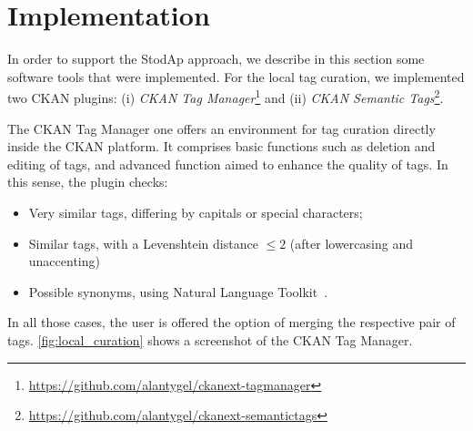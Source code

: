 \documentclass[conference]{IEEEtran}
\begin{document}

\section{Implementation}
\label{sec:implementation}

In order to support the StodAp approach, we describe in this section some software tools that were implemented.
For the local tag curation, we implemented two CKAN plugins: 
(i) \emph{CKAN Tag Manager}\footnote{\url{https://github.com/alantygel/ckanext-tagmanager}} and 
(ii) \emph{CKAN Semantic Tags}\footnote{\url{https://github.com/alantygel/ckanext-semantictags}}.

The CKAN Tag Manager one offers an environment for tag curation directly inside the CKAN platform. 
It comprises basic functions such as deletion and editing of tags, and advanced function aimed to enhance the quality of tags.
In this sense, the plugin checks:
\begin{itemize}
	\item Very similar tags, differing by capitals or special characters;
	\item Similar tags, with a Levenshtein distance $\le 2$ (after lowercasing and unaccenting)
	\item Possible synonyms, using Natural Language Toolkit~\cite{Bird2009}.
\end{itemize}
In all those cases, the user is offered the option of merging the respective pair of tags. 
\autoref{fig:local_curation} shows a screenshot of the CKAN Tag Manager.
\end{document}
